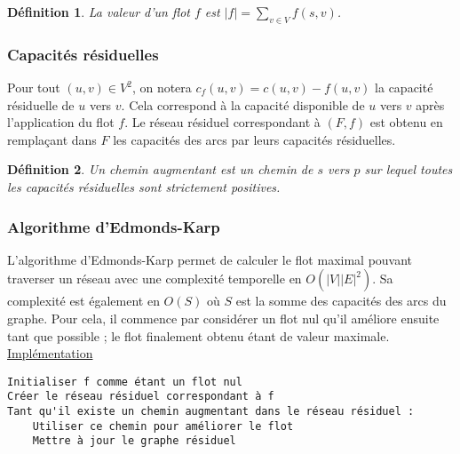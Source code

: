 \documentclass[11pt,a4paper]{article}
\newtheorem{definition}{Définition}
\begin{document}
\begin{definition}
  La valeur d'un flot \(f\) est \(|f| = \sum\limits_{v \in V} f(s,v)\).
\end{definition}


    \subsubsection{Capacités résiduelles}

Pour tout \((u,v) \in V^2\), on notera \(c_f(u,v) = c(u,v) - f(u,v)\) la capacité résiduelle de \(u\) vers \(v\). Cela correspond à la capacité disponible de \(u\) vers \(v\) après l'application du flot \(f\). Le réseau résiduel correspondant à \((F,f)\) est obtenu en remplaçant dans \(F\) les capacités des arcs par leurs capacités résiduelles.

\begin{definition}
  Un chemin augmentant est un chemin de \(s\) vers \(p\) sur lequel toutes les capacités résiduelles sont strictement positives.
\end{definition}


    \subsubsection{Algorithme d'Edmonds-Karp}
L'algorithme d'Edmonds-Karp permet de calculer le flot maximal pouvant traverser un réseau avec une complexité temporelle en \(O(|V| |E|^2)\). Sa complexité est également en \(O(S)\) où \(S\) est la somme des capacités des arcs du graphe. Pour cela, il commence par considérer un flot nul qu'il améliore ensuite tant que possible ; le flot finalement obtenu étant de valeur maximale. \href{https://github.com/AdrienVannson/algo-lib/blob/master/include/graphs/algorithms/edmonds-karp.hpp}{Implémentation}

\begin{lstlisting}
Initialiser f comme étant un flot nul
Créer le réseau résiduel correspondant à f
Tant qu'il existe un chemin augmentant dans le réseau résiduel :
    Utiliser ce chemin pour améliorer le flot
    Mettre à jour le graphe résiduel
\end{lstlisting}
\end{document}
